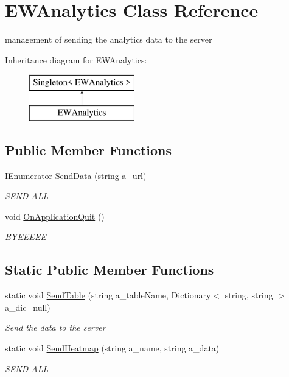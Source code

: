 \hypertarget{class_e_w_analytics}{}\section{E\+W\+Analytics Class Reference}
\label{class_e_w_analytics}


management of sending the analytics data to the server  


Inheritance diagram for E\+W\+Analytics\+:\begin{figure}[H]
\begin{center}
\leavevmode
\includegraphics[height=2.000000cm]{class_e_w_analytics}
\end{center}
\end{figure}
\subsection*{Public Member Functions}
\begin{DoxyCompactItemize}
\item 
I\+Enumerator \mbox{\hyperlink{class_e_w_analytics_a7b8c3295e831cd066ab9b3de90d02a45}{Send\+Data}} (string a\+\_\+url)
\begin{DoxyCompactList}\small\item\em S\+E\+ND A\+LL \end{DoxyCompactList}\item 
void \mbox{\hyperlink{class_e_w_analytics_a782a29c4da578b817de9038de174c156}{On\+Application\+Quit}} ()
\begin{DoxyCompactList}\small\item\em B\+Y\+E\+E\+E\+EE \end{DoxyCompactList}\end{DoxyCompactItemize}
\subsection*{Static Public Member Functions}
\begin{DoxyCompactItemize}
\item 
static void \mbox{\hyperlink{class_e_w_analytics_a39edda10ecc7559f4a2919fcc9342163}{Send\+Table}} (string a\+\_\+table\+Name, Dictionary$<$ string, string $>$ a\+\_\+dic=null)
\begin{DoxyCompactList}\small\item\em Send the data to the server \end{DoxyCompactList}\item 
static void \mbox{\hyperlink{class_e_w_analytics_aa97cecf6553604b7d2e0200cfb4b0f75}{Send\+Heatmap}} (string a\+\_\+name, string a\+\_\+data)
\begin{DoxyCompactList}\small\item\em S\+E\+ND A\+LL \end{DoxyCompactList}\end{DoxyCompactItemize}
